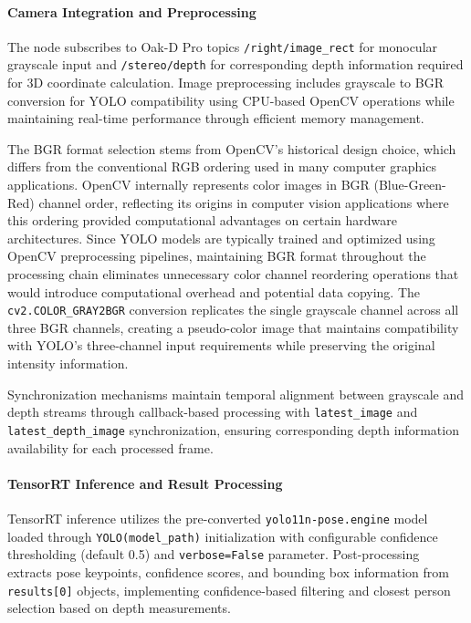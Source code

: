 \paragraph{Camera Integration and Preprocessing}

The node subscribes to Oak-D Pro topics \texttt{/right/image\_rect} for monocular grayscale input and \texttt{/stereo/depth} for corresponding depth information required for 3D coordinate calculation. Image preprocessing includes grayscale to BGR conversion for YOLO compatibility using CPU-based OpenCV operations while maintaining real-time performance through efficient memory management.

The BGR format selection stems from OpenCV's historical design choice, which differs from the conventional RGB ordering used in many computer graphics applications. OpenCV internally represents color images in BGR (Blue-Green-Red) channel order, reflecting its origins in computer vision applications where this ordering provided computational advantages on certain hardware architectures. Since YOLO models are typically trained and optimized using OpenCV preprocessing pipelines, maintaining BGR format throughout the processing chain eliminates unnecessary color channel reordering operations that would introduce computational overhead and potential data copying. The \texttt{cv2.COLOR\_GRAY2BGR} conversion replicates the single grayscale channel across all three BGR channels, creating a pseudo-color image that maintains compatibility with YOLO's three-channel input requirements while preserving the original intensity information.

Synchronization mechanisms maintain temporal alignment between grayscale and depth streams through callback-based processing with \texttt{latest\_image} and \texttt{latest\_depth\_image} synchronization, ensuring corresponding depth information availability for each processed frame.

\paragraph{TensorRT Inference and Result Processing}

TensorRT inference utilizes the pre-converted \texttt{yolo11n-pose.engine} model loaded through \texttt{YOLO(model\_path)} initialization with configurable confidence thresholding (default 0.5) and \texttt{verbose=False} parameter. Post-processing extracts pose keypoints, confidence scores, and bounding box information from \texttt{results[0]} objects, implementing confidence-based filtering and closest person selection based on depth measurements.

